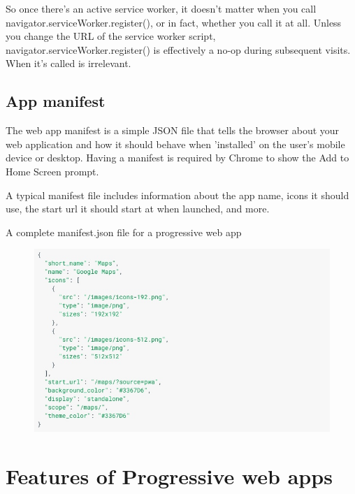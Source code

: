 \documentclass[14pt,a4paper,final]{extreport}
\begin{document}
So once there's an active service worker, it doesn't matter when you call navigator.serviceWorker.register(), or in fact, whether you call it at all. Unless you change the URL of the service worker script, navigator.serviceWorker.register() is effectively a no-op during subsequent visits. When it's called is irrelevant.
\section{App manifest}
\item The web app manifest is a simple JSON file that tells the browser about your web application and how it should behave when 'installed' on the user's mobile device or desktop. Having a manifest is required by Chrome to show the Add to Home Screen prompt.

A typical manifest file includes information about the app name, icons it should use, the start url it should start at when launched, and more.
\item A complete manifest.json file for a progressive web app
\begin{figure}[h]
		\includegraphics[scale=.7]{s2.jpeg}
	
    
\end{figure}

\chapter{Features of Progressive web apps}
\end{document}
